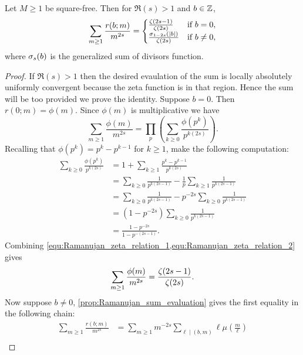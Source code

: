       \begin{lemma}\label{lem:Ramanujan_zeta_relation}
        Let $M \ge 1$ be square-free. Then for $\Re(s) > 1$ and $b \in \mathbb{Z}$,
        \[
          \sum_{m \ge 1}\frac{r(b;m)}{m^{2s}} = \begin{cases} \frac{\zeta(2s-1)}{\zeta(2s)} & \text{if $b = 0$}, \\ \frac{\sigma_{1-2s}(|b|)}{\zeta(2s)} & \text{if $b \neq 0$}, \end{cases}
        \]
        where $\sigma_{s}(b)$ is the generalized sum of divisors function.
      \end{lemma}
      \begin{proof}
        If $\Re(s) > 1$ then the desired evaulation of the sum is locally absolutely uniformly convergent because the zeta function is in that region. Hence the sum will be too provided we prove the identity. Suppose $b = 0$. Then $r(0;m) = \phi(m)$. Since $\phi(m)$ is multiplicative we have
        \begin{equation}\label{equ:Ramanujan_zeta_relation_1}
          \sum_{m \ge 1}\frac{\phi(m)}{m^{2s}} = \prod_{p}\left(\sum_{k \ge 0}\frac{\phi(p^{k})}{p^{k(2s)}}\right).
        \end{equation}
        Recalling that $\phi(p^{k}) = p^{k}-p^{k-1}$ for $k \ge 1$, make the following computation:
        \begin{equation}\label{equ:Ramanujan_zeta_relation_2}
          \begin{aligned}
            \sum_{k \ge 0}\frac{\phi(p^{k})}{p^{k(2s)}} &= 1+\sum_{k \ge 1}\frac{p^{k}-p^{k-1}}{p^{k(2s)}} \\
            &= \sum_{k \ge 0}\frac{1}{p^{k(2s-1)}}-\frac{1}{p}\sum_{k \ge 1}\frac{1}{p^{k(2s-1)}} \\
            &= \sum_{k \ge 0}\frac{1}{p^{k(2s-1)}}-p^{-2s}\sum_{k \ge 0}\frac{1}{p^{k(2s-1)}} \\
            &= (1-p^{-2s})\sum_{k \ge 0}\frac{1}{p^{k(2s-1)}} \\
            &= \frac{1-p^{-2s}}{1-p^{-(2s-1)}}.
          \end{aligned}
        \end{equation}
        Combining \cref{equ:Ramanujan_zeta_relation_1,equ:Ramanujan_zeta_relation_2} gives
        \[
          \sum_{m \ge 1}\frac{\phi(m)}{m^{2s}} = \frac{\zeta(2s-1)}{\zeta(2s)}.
        \]
        Now suppose $b \neq 0$, \cref{prop:Ramanujan_sum_evaluation} gives the first equality in the following chain:
        \begin{align*}
          \sum_{m \ge 1}\frac{r(b;m)}{m^{2s}} &= \sum_{m \ge 1}m^{-2s}\sum_{\ell \mid (b,m)}\ell\mu\left(\frac{m}{\ell}\right) \\

\end{align*}
\end{proof}
